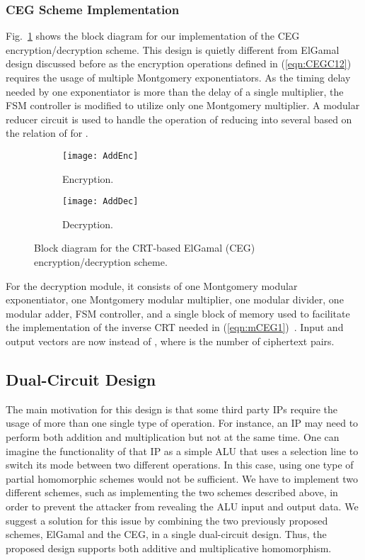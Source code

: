 \documentclass[conference]{IEEEtran}
\begin{document}
\subsubsection{\textbf{CEG Scheme Implementation}}

Fig.~\ref{fig:Add} shows the block diagram for our implementation of the CEG encryption/decryption scheme. This design is quietly different from ElGamal design discussed before as the encryption operations defined in (\ref{eqn:CEGC12}) requires the usage of multiple Montgomery exponentiators. As the timing delay needed by one exponentiator is more than the delay of a single multiplier, the FSM controller is modified to utilize only one Montgomery multiplier. A modular reducer circuit is used to handle the operation of reducing  into several  based on the relation of  for .  

\begin{figure}
    \centering
    \begin{subfigure}[bh]{0.73\linewidth}\centering
            \texttt{[image: AddEnc]}
            \caption{Encryption.}
    \end{subfigure}
    \begin{subfigure}[bh]{0.73\linewidth}\centering
            \texttt{[image: AddDec]}
            \caption{Decryption.}
    \end{subfigure}
    \caption{Block diagram for the CRT-based ElGamal (CEG) encryption/decryption scheme.}
    \label{fig:Add}
\end{figure}

For the decryption module, it consists of one Montgomery modular exponentiator, one Montgomery modular multiplier, one modular divider, one modular adder, FSM controller, and a single block of memory used to facilitate the implementation of the inverse CRT needed in (\ref{eqn:mCEG1}){\color{blue}~\cite{homoCRT}}. Input and output vectors are now  instead of , where  is the number of ciphertext pairs. 


\subsection{Dual-Circuit Design} 

The main motivation for this design is that some third party IPs require the usage of more than one single type of operation. For instance, an IP may need to perform both addition and multiplication but not at the same time. One can imagine the functionality of that IP as a simple ALU that uses a selection line to switch its mode between two different operations. In this case, using one type of partial homomorphic schemes would not be sufficient. We have to implement two different schemes, such as implementing the two schemes described above, in order to prevent the attacker from revealing the ALU input and output data. We suggest a solution for this issue by combining the two previously proposed schemes, ElGamal and the CEG, in a single dual-circuit design. Thus, the proposed design supports both additive and multiplicative homomorphism.   
\end{document}
